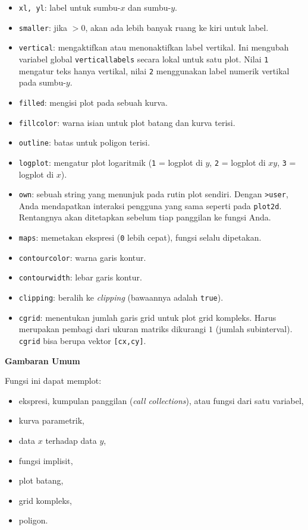 \documentclass[a4paper,11pt,oneside]{scrbook}
\newenvironment{eulernotebook}{}{}
\newenvironment{eulercomment}{\par\medskip\noindent}{\par\medskip}
\begin{document}
\begin{eulernotebook}
\begin{eulercomment}
\begin{itemize}
    \item \texttt{xl, yl}: label untuk sumbu-$x$ dan sumbu-$y$.
    \item \texttt{smaller}: jika $>0$, akan ada lebih banyak ruang ke kiri untuk label.
    \item \texttt{vertical}: mengaktifkan atau menonaktifkan label vertikal. Ini mengubah variabel global \texttt{verticallabels} secara lokal untuk satu plot. Nilai \texttt{1} mengatur teks hanya vertikal, nilai \texttt{2} menggunakan label numerik vertikal pada sumbu-$y$.
    \item \texttt{filled}: mengisi plot pada sebuah kurva.
    \item \texttt{fillcolor}: warna isian untuk plot batang dan kurva terisi.
    \item \texttt{outline}: batas untuk poligon terisi.
    \item \texttt{logplot}: mengatur plot logaritmik (\texttt{1} = logplot di $y$, \texttt{2} = logplot di $xy$, \texttt{3} = logplot di $x$).
    \item \texttt{own}: sebuah string yang menunjuk pada rutin plot sendiri. Dengan \texttt{>user}, Anda mendapatkan interaksi pengguna yang sama seperti pada \texttt{plot2d}. Rentangnya akan ditetapkan sebelum tiap panggilan ke fungsi Anda.
    \item \texttt{maps}: memetakan ekspresi (\texttt{0} lebih cepat), fungsi selalu dipetakan.
    \item \texttt{contourcolor}: warna garis kontur.
    \item \texttt{contourwidth}: lebar garis kontur.
    \item \texttt{clipping}: beralih ke \emph{clipping} (bawaannya adalah \texttt{true}).
    \item \texttt{cgrid}: menentukan jumlah garis grid untuk plot grid kompleks. Harus merupakan pembagi dari ukuran matriks dikurangi $1$ (jumlah subinterval). \texttt{cgrid} bisa berupa vektor \texttt{[cx,cy]}.
\end{itemize}

\textbf{Gambaran Umum}

Fungsi ini dapat memplot:
\begin{itemize}
    \item ekspresi, kumpulan panggilan (\emph{call collections}), atau fungsi dari satu variabel,
    \item kurva parametrik,
    \item data $x$ terhadap data $y$,
    \item fungsi implisit,
    \item plot batang,
    \item grid kompleks,
    \item poligon.
\end{itemize}


\end{eulercomment}
\end{eulernotebook}
\end{document}
